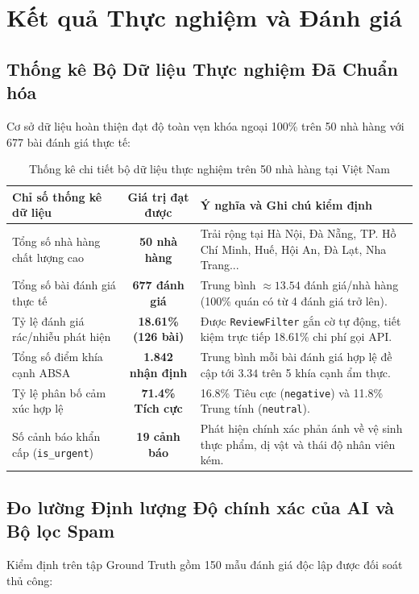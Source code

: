 \chapter{Kết quả Thực nghiệm và Đánh giá}

\section{Thống kê Bộ Dữ liệu Thực nghiệm Đã Chuẩn hóa}
Cơ sở dữ liệu hoàn thiện đạt độ toàn vẹn khóa ngoại 100\% trên 50 nhà hàng với 677 bài đánh giá thực tế:

\begin{table}[H]
\centering
\caption{Thống kê chi tiết bộ dữ liệu thực nghiệm trên 50 nhà hàng tại Việt Nam}
\label{tab:dataset_stats}
\vspace{0.15cm}
\footnotesize
\begin{tabularx}{\textwidth}{l c X}
\toprule
\rowcolor{blue!8}
\textbf{Chỉ số thống kê dữ liệu} & \textbf{Giá trị đạt được} & \textbf{Ý nghĩa và Ghi chú kiểm định} \\
\midrule
Tổng số nhà hàng chất lượng cao & \textbf{50 nhà hàng} & Trải rộng tại Hà Nội, Đà Nẵng, TP. Hồ Chí Minh, Huế, Hội An, Đà Lạt, Nha Trang... \\
Tổng số bài đánh giá thực tế & \textbf{677 đánh giá} & Trung bình $\approx 13.54$ đánh giá/nhà hàng (100\% quán có từ 4 đánh giá trở lên). \\
Tỷ lệ đánh giá rác/nhiễu phát hiện & \textbf{18.61\% (126 bài)} & Được \texttt{ReviewFilter} gắn cờ tự động, tiết kiệm trực tiếp 18.61\% chi phí gọi API. \\
Tổng số điểm khía cạnh ABSA & \textbf{1.842 nhận định} & Trung bình mỗi bài đánh giá hợp lệ đề cập tới $3.34$ trên 5 khía cạnh ẩm thực. \\
Tỷ lệ phân bố cảm xúc hợp lệ & \textbf{71.4\% Tích cực} & 16.8\% Tiêu cực (\texttt{negative}) và 11.8\% Trung tính (\texttt{neutral}). \\
Số cảnh báo khẩn cấp (\texttt{is\_urgent}) & \textbf{19 cảnh báo} & Phát hiện chính xác phản ánh về vệ sinh thực phẩm, dị vật và thái độ nhân viên kém. \\
\bottomrule
\end{tabularx}
\end{table}

\section{Đo lường Định lượng Độ chính xác của AI và Bộ lọc Spam}
Kiểm định trên tập Ground Truth gồm 150 mẫu đánh giá độc lập được đối soát thủ công:

